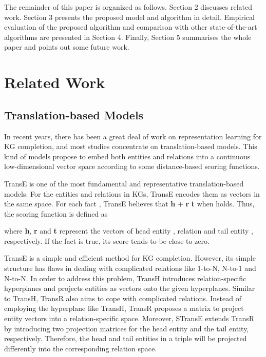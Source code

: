 \documentclass[11pt,a4paper]{article}
\begin{document}
The remainder of this paper is organized as follows. Section 2
discusses related work. Section 3 presents the proposed model and
algorithm in detail. Empirical evaluation of the proposed algorithm
and comparison with other state-of-the-art algorithms are presented
in Section 4. Finally, Section 5 summarises the whole paper and
points out some future work.


\section{Related Work}

\subsection{Translation-based Models}

In recent years, there has been a great deal of work on
representation learning for KG completion, and most studies
concentrate on translation-based models. This kind of models
propose to embed both entities and relations into a continuous
low-dimensional vector space according to some distance-based
scoring functions.

TransE \cite{bordes2013translating} is one of the most fundamental
and representative translation-based models. For the entities and
relations in KGs, TransE encodes them as vectors in the same space.
For each fact , TransE believes that \textbf{h} +
\textbf{r}  \textbf{t} when  holds. Thus, the
scoring function is defined as

where \textbf{h}, \textbf{r} and \textbf{t} represent the vectors of
head entity , relation  and tail entity , respectively. If
the fact  is true, its score 
tends to be close to zero.

TransE is a simple and efficient method for KG completion. However,
its simple structure has flaws in dealing with complicated relations
like 1-to-N, N-to-1 and N-to-N.
In order to address this problem, TransH
\cite{wang2014knowledge} introduces relation-specific hyperplanes
and projects entities as vectors onto the given hyperplanes. Similar
to TransH, TransR \cite{lin2015learning} also aims to cope with
complicated relations. Instead of employing the hyperplane like TransH, TransR proposes a
matrix  to project entity vectors into a
relation-specific space. Moreover, STransE \cite{nguyen2016stranse}
extends TransR by introducing two projection matrices for the head
entity and the tail entity, respectively. Therefore, the head and
tail entities in a triple will be projected differently into the
corresponding relation space.
\end{document}
